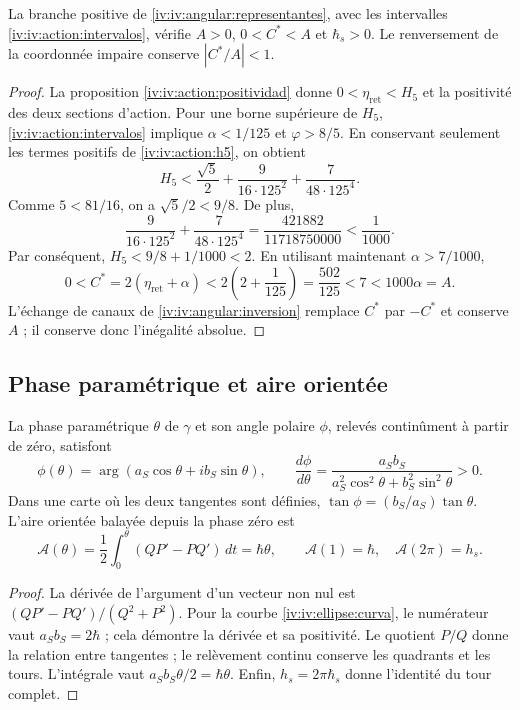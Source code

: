 \begin{proposition}
\label{iv:iv:ellipse:pertenencia}
La branche positive de \eqref{iv:iv:angular:representantes}, avec les
intervalles \eqref{iv:iv:action:intervalos}, vérifie
\(A>0\), \(0<C^*<A\) et \(\hbar_s>0\).
Le renversement de la coordonnée impaire conserve \(|C^*/A|<1\).
\end{proposition}
\begin{proof}
La proposition \ref{iv:iv:action:positividad} donne
\(0<\eta_{\mathrm{ret}}<H_5\) et la positivité des deux
sections d’action. Pour une borne supérieure de \(H_5\),
\eqref{iv:iv:action:intervalos} implique
\(\alpha<1/125\) et \(\varphi>8/5\). En conservant seulement
les termes positifs de \eqref{iv:iv:action:h5}, on obtient
\[
 H_5<
 \frac{\sqrt5}{2}+
 \frac{9}{16\cdot125^2}+
 \frac{7}{48\cdot125^4}.
\]
Comme \(5<81/16\), on a \(\sqrt5/2<9/8\). De plus,
\[
 \frac{9}{16\cdot125^2}+
 \frac{7}{48\cdot125^4}
 =\frac{421882}{11718750000}<\frac1{1000}.
\]
Par conséquent, \(H_5<9/8+1/1000<2\). En utilisant maintenant
\(\alpha>7/1000\),
\[
 0<C^*=2(\eta_{\mathrm{ret}}+\alpha)
 <2\left(2+\frac1{125}\right)=\frac{502}{125}
 <7<1000\alpha=A.
\]
L’échange de canaux de
\ref{iv:iv:angular:inversion} remplace \(C^*\) par \(-C^*\)
et conserve \(A\) ; il conserve donc l’inégalité absolue.
\end{proof}

\subsection{Phase paramétrique et aire orientée}
\label{iv:iv:ellipse:area}

\begin{proposition}
\label{iv:iv:ellipse:ley-areal}
La phase paramétrique \(\theta\) de \(\gamma\) et son angle
polaire \(\phi\), relevés continûment à partir de zéro, satisfont
\begin{equation}
 \phi(\theta)=\arg(a_S\cos\theta+i b_S\sin\theta),\qquad
 \frac{d\phi}{d\theta}
 =\frac{a_Sb_S}{a_S^2\cos^2\theta+b_S^2\sin^2\theta}>0.
 \label{iv:iv:ellipse:fases}
\end{equation}
Dans une carte où les deux tangentes sont définies,
\(\tan\phi=(b_S/a_S)\tan\theta\). L’aire orientée balayée
depuis la phase zéro est
\begin{equation}
 \mathcal A(\theta)=
 \frac12\int_0^\theta(QP'-PQ')\,dt=\hbar\theta,
 \qquad
 \mathcal A(1)=\hbar,\quad\mathcal A(2\pi)=h_s.
 \label{iv:iv:ellipse:area-fase}
\end{equation}
\end{proposition}
\begin{proof}
La dérivée de l’argument d’un vecteur non nul est
\((QP'-PQ')/(Q^2+P^2)\). Pour la courbe
\eqref{iv:iv:ellipse:curva}, le numérateur vaut
\(a_Sb_S=2\hbar\) ; cela démontre la dérivée et sa
positivité. Le quotient \(P/Q\) donne la relation entre tangentes ;
le relèvement continu conserve les quadrants et les tours.
L’intégrale vaut \(a_Sb_S\theta/2=\hbar\theta\).
Enfin, \(h_s=2\pi\hbar_s\) donne l’identité du
tour complet.
\end{proof}

